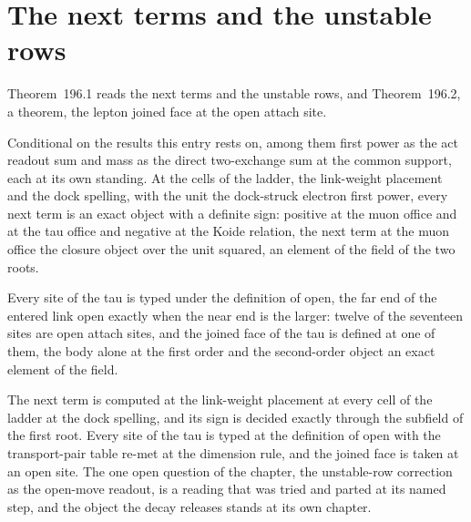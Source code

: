 \section{The next terms and the unstable rows}\label{mod:VIII-3-next-terms-and-the-unstable-rows}
\label{narr:open:8-3}Theorem~196.1 reads the next terms and the unstable rows, and Theorem~196.2, a theorem, the lepton joined face at the open attach site.
\begin{chconditional}\label{box:VIII-3-next-terms-and-the-unstable-rows:1}
Conditional on the results this entry rests on, among them first power as the act readout sum and mass as the direct two-exchange sum at the common support, each at its own standing. At the cells of the ladder, the link-weight placement and the dock spelling, with the unit the dock-struck electron first power, every next term is an exact object with a definite sign: positive at the muon office and at the tau office and negative at the Koide relation, the next term at the muon office the closure object over the unit squared, an element of the field of the two roots.
\end{chconditional}
\begin{chtheorem}\label{box:VIII-3-next-terms-and-the-unstable-rows:2}
Every site of the tau is typed under the definition of open, the far end of the entered link open exactly when the near end is the larger: twelve of the seventeen sites are open attach sites, and the joined face of the tau is defined at one of them, the body alone at the first order and the second-order object an exact element of the field.
\end{chtheorem}
The next term is computed at the link-weight placement at every cell of the ladder at the dock spelling, and its sign is decided exactly through the subfield of the first root. Every site of the tau is typed at the definition of open with the transport-pair table re-met at the dimension rule, and the joined face is taken at an open site. The one open question of the chapter, the unstable-row correction as the open-move readout, is a reading that was tried and parted at its named step, and the object the decay releases stands at its own chapter.
